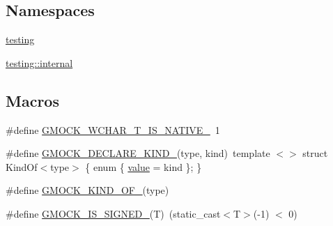 \subsection*{Namespaces}
\begin{DoxyCompactItemize}
\item 
 \mbox{\hyperlink{namespacetesting}{testing}}
\item 
 \mbox{\hyperlink{namespacetesting_1_1internal}{testing\+::internal}}
\end{DoxyCompactItemize}
\subsection*{Macros}
\begin{DoxyCompactItemize}
\item 
\#define \mbox{\hyperlink{_obj__test_2lib_2googletest-master_2googlemock_2include_2gmock_2internal_2gmock-internal-utils_8h_a0725bd2b3326d282677e5197e53cc5e9}{G\+M\+O\+C\+K\+\_\+\+W\+C\+H\+A\+R\+\_\+\+T\+\_\+\+I\+S\+\_\+\+N\+A\+T\+I\+V\+E\+\_\+}}~1
\item 
\#define \mbox{\hyperlink{_obj__test_2lib_2googletest-master_2googlemock_2include_2gmock_2internal_2gmock-internal-utils_8h_a7d8a1871d7a30543a4e1882a8b2bbcd8}{G\+M\+O\+C\+K\+\_\+\+D\+E\+C\+L\+A\+R\+E\+\_\+\+K\+I\+N\+D\+\_\+}}(type,  kind)~template $<$$>$ struct Kind\+Of$<$type$>$ \{ enum \{ \mbox{\hyperlink{_obj__test_2lib_2googletest-master_2googlemock_2test_2gmock-matchers__test_8cc_a337b8a670efc0b086ad3af163f3121b6}{value}} = kind \}; \}
\item 
\#define \mbox{\hyperlink{_obj__test_2lib_2googletest-master_2googlemock_2include_2gmock_2internal_2gmock-internal-utils_8h_a72b01bdd08b78e927270885ca880ead4}{G\+M\+O\+C\+K\+\_\+\+K\+I\+N\+D\+\_\+\+O\+F\+\_\+}}(type)
\item 
\#define \mbox{\hyperlink{_obj__test_2lib_2googletest-master_2googlemock_2include_2gmock_2internal_2gmock-internal-utils_8h_a8ee49a1af821b48fd83849c050d0d5a2}{G\+M\+O\+C\+K\+\_\+\+I\+S\+\_\+\+S\+I\+G\+N\+E\+D\+\_\+}}(T)~(static\+\_\+cast$<$T$>$(-\/1) $<$ 0)
\end{DoxyCompactItemize}
